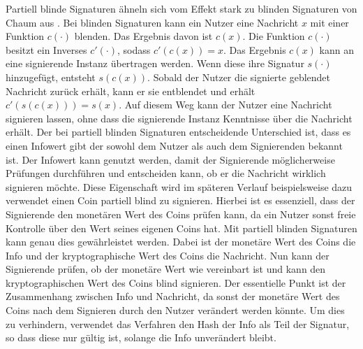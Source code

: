 \documentclass[
	fontsize=11pt,
	headings=small,
	parskip=half,           %
	bibliography=totoc,
	numbers=noenddot,       %
	open=any,               %
]{scrreprt}
\begin{document}
Partiell blinde Signaturen ähneln sich vom Effekt stark zu blinden Signaturen von Chaum aus \cite{chaum1983blind}. Bei blinden Signaturen kann ein Nutzer eine Nachricht $x$ mit einer Funktion $c(\cdot)$ blenden. Das Ergebnis davon ist $c(x)$. Die Funktion $c(\cdot)$ besitzt ein Inverses $c'(\cdot)$, sodass $c'(c(x)) = x$. Das Ergebnis $c(x)$ kann an eine signierende Instanz übertragen werden. Wenn diese ihre Signatur $s(\cdot)$ hinzugefügt, entsteht $s(c(x))$. Sobald der Nutzer die signierte geblendet Nachricht zurück erhält, kann er sie entblendet und erhält $c'(s(c(x))) = s(x)$. Auf diesem Weg kann der Nutzer eine Nachricht signieren lassen, ohne dass die signierende Instanz Kenntnisse über die Nachricht erhält. Der bei partiell blinden Signaturen entscheidende Unterschied ist, dass es einen Infowert gibt der sowohl dem Nutzer als auch dem Signierenden bekannt ist. Der Infowert kann genutzt werden, damit der Signierende möglicherweise Prüfungen durchführen und entscheiden kann, ob er die Nachricht wirklich signieren möchte. Diese Eigenschaft wird im späteren Verlauf beispielsweise dazu verwendet einen Coin partiell blind zu signieren. Hierbei ist es essenziell, dass der Signierende den monetären Wert des Coins prüfen kann, da ein Nutzer sonst freie Kontrolle über den Wert seines eigenen Coins hat. Mit partiell blinden Signaturen kann genau dies gewährleistet werden. Dabei ist der monetäre Wert des Coins die Info und der kryptographische Wert des Coins die Nachricht. Nun kann der Signierende prüfen, ob der monetäre Wert wie vereinbart ist und kann den kryptographischen Wert des Coins blind signieren. Der essentielle Punkt ist der Zusammenhang zwischen Info und Nachricht, da sonst der monetäre Wert des Coins nach dem Signieren durch den Nutzer verändert werden könnte. Um dies zu verhindern, verwendet das Verfahren den Hash der Info als Teil der Signatur, so dass diese nur gültig ist, solange die Info unverändert bleibt.
\end{document}
